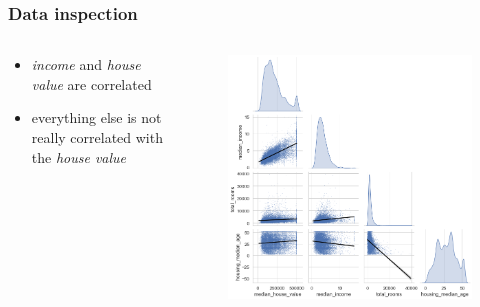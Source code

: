 \documentclass[aspectratio=169]{beamer}
\begin{document}
	\begin{frame}
		\frametitle{Data inspection}
		\begin{columns}
			\begin{column}{0.5\textwidth}
				\begin{itemize}
					\item \textit{income} and \textit{house value} are correlated
					\item everything else is not really correlated with the \textit{house value}
				\end{itemize}
			\end{column}
			\begin{column}{0.5\textwidth}
				\begin{figure}
					\includegraphics[width=\textwidth]{./../plots/corrolations.png}
				\end{figure}
			\end{column}
		\end{columns}
	\end{frame}
\end{document}
